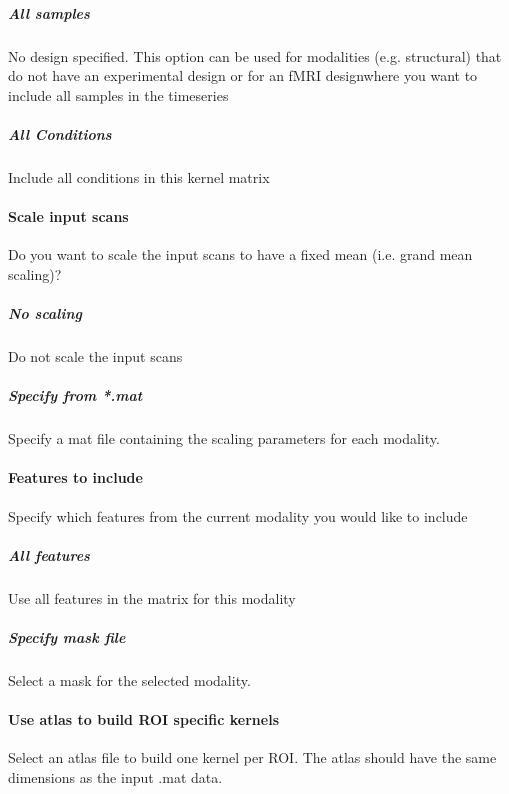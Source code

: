 \subparagraph{All samples}
No design specified. This option can be used for modalities (e.g. structural) that do not have an experimental design or for an fMRI designwhere you want to include all samples in the timeseries


\subparagraph{All Conditions}
Include all conditions in this kernel matrix


\paragraph{Scale input scans}
Do you want to scale the input scans to have a fixed mean (i.e. grand mean scaling)?


\subparagraph{No scaling}
Do not scale the input scans


\subparagraph{Specify from *.mat}
Specify a mat file containing the scaling parameters for each modality.


\paragraph{Features to include}
Specify which features from the current modality you would like to include


\subparagraph{All features}
Use all features in the matrix for this modality


\subparagraph{Specify mask file}
Select a mask for the selected modality.


\paragraph{Use atlas to build ROI specific kernels}
Select an atlas file to build one kernel per ROI. The atlas should have the same dimensions as the input .mat data.

